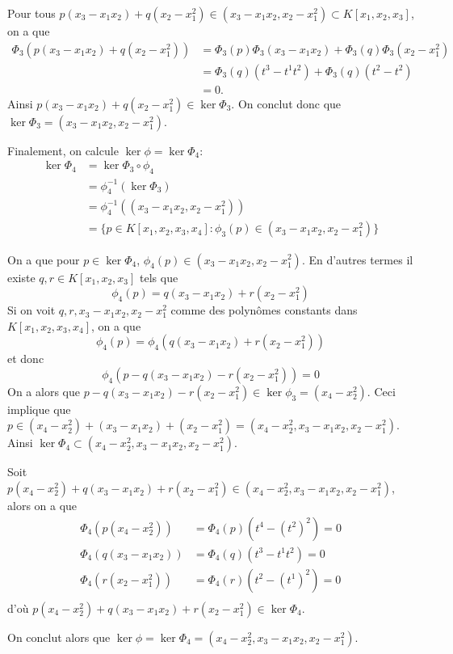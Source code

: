 \documentclass[french]{article}
\begin{document}
Pour tous $p(x_3 - x_1x_2) + q(x_2 - x_1^2) \in (x_3-x_1x_2, x_2 - x_1^2)
\subset K[x_1, x_2, x_3]$, on a que
\begin{align*}
\Phi_3(p(x_3 - x_1x_2) + q(x_2 - x_1^2)) &=
\Phi_3(p)\Phi_3(x_3 - x_1x_2) + \Phi_3(q)\Phi_3(x_2 - x_1^2)\\
&= \Phi_3(q)(t^3 - t^1t^2) + \Phi_3(q)(t^2 - t^2)\\
&= 0.
\end{align*}
Ainsi $p(x_3 - x_1x_2) + q(x_2 - x_1^2) \in \ker\Phi_3$.
On conclut donc que $\ker \Phi_3 = {(x_3 - x_1x_2, x_2 - x_1^2)}$.

Finalement, on calcule $\ker \phi = \ker\Phi_4$:
\begin{align*}
	\ker\Phi_4 &= \ker \Phi_3\circ\phi_4\\
	&= \phi_4^{-1}(\ker\Phi_3)\\
	&= \phi_4^{-1}((x_3 - x_1x_2, x_2 - x_1^2))\\
	&= \{p \in K[x_1, x_2, x_3, x_4]: \phi_3(p) \in (x_3 - x_1x_2, x_2 - x_1^2)\}
\end{align*}

On a que pour $p \in \ker \Phi_4$, $\phi_4(p) \in (x_3 - x_1x_2, x_2 - x_1^2)$.
En d'autres termes il existe $q, r \in K[x_1, x_2, x_3]$ tels que
\begin{equation*}
	\phi_4(p) = q(x_3 - x_1x_2) + r(x_2 - x_1^2)
\end{equation*}
Si on voit $q, r, x_3 - x_1x_2, x_2 - x_1^2$ comme des polynômes constants dans
$K[x_1, x_2, x_3, x_4]$, on a que
\begin{equation*}
	\phi_4(p) = \phi_4(q(x_3 - x_1x_2) + r(x_2 - x_1^2))
\end{equation*}
et donc
\begin{equation*}
	\phi_4(p - q(x_3 - x_1x_2) - r(x_2 - x_1^2)) = 0
\end{equation*}
On a alors que $p - q(x_3 - x_1x_2) - r(x_2 - x_1^2) \in \ker\phi_3 = 
(x_4 - x_2^2)$.
Ceci implique que $p \in (x_4 - x_2^2) + (x_3 - x_1x_2) + (x_2 - x_1^2) = 
(x_4 - x_2^2, x_3 - x_1x_2, x_2 - x_1^2)$.
Ainsi $\ker\Phi_4 \subset (x_4 - x_2^2, x_3 - x_1x_2, x_2 - x_1^2)$.

Soit $p(x_4 - x_2^2) + q(x_3 - x_1x_2) + r(x_2 - x_1^2) \in
(x_4 - x_2^2, x_3 - x_1x_2, x_2 - x_1^2)$, alors on a que
\begin{align*}
	\Phi_4(p(x_4 - x_2^2)) &= \Phi_4(p)(t^4 - (t^2)^2) = 0\\
	\Phi_4(q(x_3 - x_1x_2)) &= \Phi_4(q)(t^3 - t^1t^2) = 0\\
	\Phi_4(r(x_2 - x_1^2)) &= \Phi_4(r)(t^2 - (t^1)^2) = 0\\
\end{align*}
d'où $p(x_4 - x_2^2) + q(x_3 - x_1x_2) + r(x_2 - x_1^2) \in \ker\Phi_4$.

On conclut alors que $\ker \phi = \ker \Phi_4 = (x_4 - x_2^2, x_3 - x_1x_2, x_2
- x_1^2)$.
\end{document}
